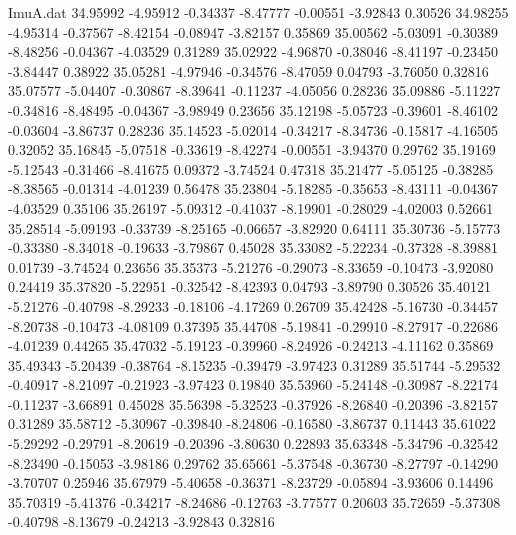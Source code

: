 \begin{filecontents}{ImuA.dat}
  34.95992   -4.95912   -0.34337   -8.47777   -0.00551   -3.92843    0.30526
  34.98255   -4.95314   -0.37567   -8.42154   -0.08947   -3.82157    0.35869
  35.00562   -5.03091   -0.30389   -8.48256   -0.04367   -4.03529    0.31289
  35.02922   -4.96870   -0.38046   -8.41197   -0.23450   -3.84447    0.38922
  35.05281   -4.97946   -0.34576   -8.47059    0.04793   -3.76050    0.32816
  35.07577   -5.04407   -0.30867   -8.39641   -0.11237   -4.05056    0.28236
  35.09886   -5.11227   -0.34816   -8.48495   -0.04367   -3.98949    0.23656
  35.12198   -5.05723   -0.39601   -8.46102   -0.03604   -3.86737    0.28236
  35.14523   -5.02014   -0.34217   -8.34736   -0.15817   -4.16505    0.32052
  35.16845   -5.07518   -0.33619   -8.42274   -0.00551   -3.94370    0.29762
  35.19169   -5.12543   -0.31466   -8.41675    0.09372   -3.74524    0.47318
  35.21477   -5.05125   -0.38285   -8.38565   -0.01314   -4.01239    0.56478
  35.23804   -5.18285   -0.35653   -8.43111   -0.04367   -4.03529    0.35106
  35.26197   -5.09312   -0.41037   -8.19901   -0.28029   -4.02003    0.52661
  35.28514   -5.09193   -0.33739   -8.25165   -0.06657   -3.82920    0.64111
  35.30736   -5.15773   -0.33380   -8.34018   -0.19633   -3.79867    0.45028
  35.33082   -5.22234   -0.37328   -8.39881    0.01739   -3.74524    0.23656
  35.35373   -5.21276   -0.29073   -8.33659   -0.10473   -3.92080    0.24419
  35.37820   -5.22951   -0.32542   -8.42393    0.04793   -3.89790    0.30526
  35.40121   -5.21276   -0.40798   -8.29233   -0.18106   -4.17269    0.26709
  35.42428   -5.16730   -0.34457   -8.20738   -0.10473   -4.08109    0.37395
  35.44708   -5.19841   -0.29910   -8.27917   -0.22686   -4.01239    0.44265
  35.47032   -5.19123   -0.39960   -8.24926   -0.24213   -4.11162    0.35869
  35.49343   -5.20439   -0.38764   -8.15235   -0.39479   -3.97423    0.31289
  35.51744   -5.29532   -0.40917   -8.21097   -0.21923   -3.97423    0.19840
  35.53960   -5.24148   -0.30987   -8.22174   -0.11237   -3.66891    0.45028
  35.56398   -5.32523   -0.37926   -8.26840   -0.20396   -3.82157    0.31289
  35.58712   -5.30967   -0.39840   -8.24806   -0.16580   -3.86737    0.11443
  35.61022   -5.29292   -0.29791   -8.20619   -0.20396   -3.80630    0.22893
  35.63348   -5.34796   -0.32542   -8.23490   -0.15053   -3.98186    0.29762
  35.65661   -5.37548   -0.36730   -8.27797   -0.14290   -3.70707    0.25946
  35.67979   -5.40658   -0.36371   -8.23729   -0.05894   -3.93606    0.14496
  35.70319   -5.41376   -0.34217   -8.24686   -0.12763   -3.77577    0.20603
  35.72659   -5.37308   -0.40798   -8.13679   -0.24213   -3.92843    0.32816

\end{filecontents}
